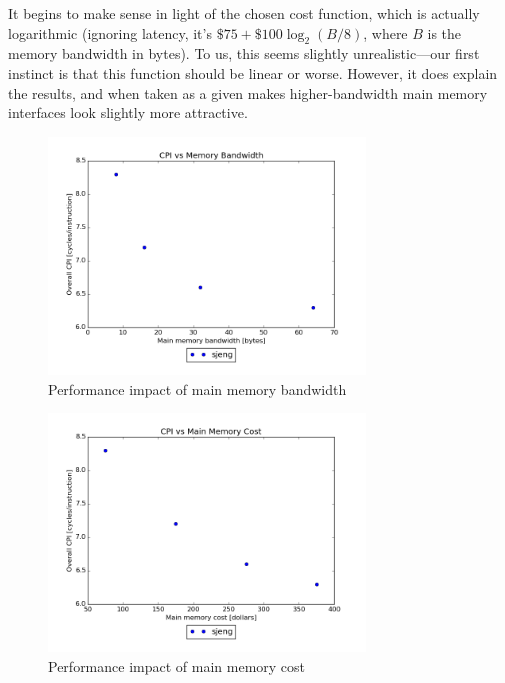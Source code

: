 \documentclass{article}
\begin{document}
It begins to make sense in light of the chosen cost function, which is actually
logarithmic (ignoring latency, it's $\$75 + \$100 \log_2(B / 8)$, where $B$ is
the memory bandwidth in bytes). To us, this seems slightly unrealistic---our
first instinct is that this function should be linear or worse. However, it does
explain the results, and when taken as a given makes higher-bandwidth main
memory interfaces look slightly more attractive.

\begin{figure}[ht]
    \centering
    \includegraphics[width=0.75\textwidth]{plots/CPI_vs_Bandwidth.png}
    \caption{Performance impact of main memory bandwidth}
    \label{fig:cpivsband}
\end{figure}

\begin{figure}[ht]
    \centering
    \includegraphics[width=0.75\textwidth]{plots/CPI_vs_Main_Mem_Cost.png}
    \caption{Performance impact of main memory cost}
    \label{fig:cpivsmainmemcost}
\end{figure}
\end{document}
